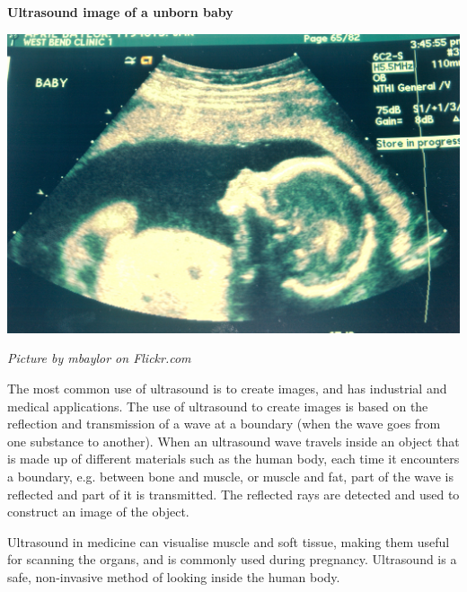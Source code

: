 \begin{minipage}{.5\textwidth}
\begin{center}
\textbf{Ultrasound image of a unborn baby}\par
\includegraphics[width=.8\columnwidth]{photos/ultrasound_mbaylor_flickr.jpg}
\par\textit{Picture by mbaylor on Flickr.com}
\end{center}
\end{minipage}
\begin{minipage}{.5\textwidth}
      \label{m38800*id185140}The most common use of ultrasound is to create images, and has industrial and medical applications. The use of ultrasound to create images is based on the reflection and transmission of a wave at a boundary (when the wave goes from one substance to another). When an ultrasound wave travels inside an object that is made up of different materials such as the human body, each time it encounters a boundary, e.g. between bone and muscle, or muscle and fat, part of the wave is reflected and part of it is transmitted. The reflected rays are detected and used to construct an image of the object.\par 
      \label{m38800*id185148}Ultrasound in medicine can visualise muscle and soft tissue, making them useful for scanning the organs, and is commonly used during pregnancy. Ultrasound is a safe, non-invasive method of looking inside the human body.\par 
      
\end{minipage}

